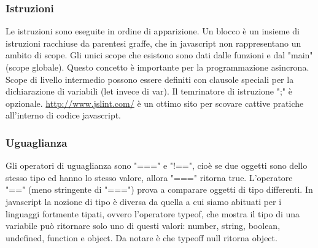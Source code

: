 \subsubsection{Istruzioni}
Le istruzioni sono eseguite in ordine di apparizione.\newline
\newline
Un blocco è un insieme di istruzioni racchiuse da parentesi graffe, che in javascript non rappresentano un ambito di scope. Gli unici scope che esistono sono dati dalle funzioni e dal "main" (scope globale). Questo concetto è importante per la programmazione asincrona.\newline
\newline
Scope di livello intermedio possono essere definiti con clausole speciali per la dichiarazione di variabili (let invece di var).\newline
\newline
Il temrinatore di istruzione ";" è opzionale.\newline
\newline
\url{http://www.jslint.com/} è un ottimo sito per scovare cattive pratiche all'interno di codice javascript.
\subsubsection{Uguaglianza}
Gli operatori di uguaglianza sono "===" e "!==", cioè se due oggetti sono dello stesso tipo ed hanno lo stesso valore, allora "===" ritorna true.\newline
\newline
L'operatore "==" (meno stringente di "===") prova a comparare oggetti di tipo differenti.\newline
\newline
In javascript la nozione di tipo è diversa da quella a cui siamo abituati per i linguaggi fortmente tipati, ovvero l'operatore typeof, che mostra il tipo di una variabile può ritornare solo uno di questi valori: number, string, boolean, undefined, function e object. Da notare è che typeoff null ritorna object.
